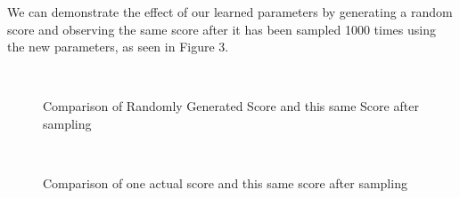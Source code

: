 \documentclass{article}
\begin{document}
We can demonstrate the effect of our learned parameters by generating a random score and observing the same score after it has been sampled 1000 times using the new parameters, as seen in Figure 3.

\begin{figure}
\centering
\mbox{
\quad
{}
}
\centering
\caption{Comparison of Randomly Generated Score and this same Score after sampling}
\label{fig-all}
\end{figure}

\begin{figure}
\centering
\mbox{
\quad
{}
}
\centering
\caption{Comparison of one actual score and this same score after sampling}
\label{fig-all}
\end{figure}
\end{document}
